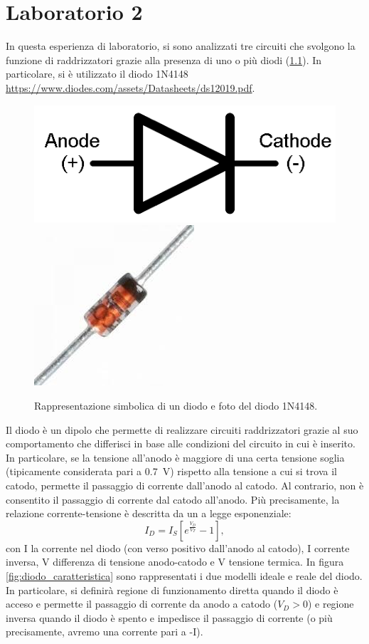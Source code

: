 \chapter{Laboratorio 2}
In questa esperienza di laboratorio, si sono analizzati tre circuiti che svolgono la funzione di raddrizzatori grazie alla presenza di uno o più diodi (\Fig\ref{fig:diodo}). In particolare, si è utilizzato il diodo 1N4148 \url{https://www.diodes.com/assets/Datasheets/ds12019.pdf}.
\begin{figure}[h]
	\centering
	\includegraphics[width=0.3\linewidth]{./ImageFiles/Laboratorio 2/diodo_1}
	\includegraphics[width=0.2\linewidth]{./ImageFiles/Laboratorio 2/diodo_4}
	\caption{Rappresentazione simbolica di un diodo e foto del diodo 1N4148.}
	\label{fig:diodo}
\end{figure}
Il diodo è un dipolo che permette di realizzare circuiti raddrizzatori grazie al suo comportamento che differisci in base alle condizioni del circuito in cui è inserito. In particolare, se la tensione all'anodo è maggiore di una certa tensione soglia (tipicamente considerata pari a \SI{0.7}{\volt}) rispetto alla tensione a cui si trova il catodo, permette il passaggio di corrente dall'anodo al catodo. Al contrario, non è consentito il passaggio di corrente dal catodo all'anodo. Più precisamente, la relazione corrente-tensione è descritta da un a legge esponenziale:
\begin{equation}
	I_D=I_S[e^{\frac{V_D}{V_T}}-1],
\end{equation}
con I la corrente nel diodo (con verso positivo dall'anodo al catodo), I corrente inversa, V differenza di tensione anodo-catodo e V tensione termica. In figura \ref{fig:diodo_caratteristica} sono rappresentati i due modelli ideale e reale del diodo. In particolare, si definirà regione di funzionamento diretta quando il diodo è acceso e permette il passaggio di corrente da anodo a catodo ($V_{D}>0$) e regione inversa quando il diodo è spento e impedisce il passaggio di corrente (o più precisamente, avremo una corrente pari a -I).
